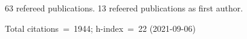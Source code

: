 63 refereed publications. 13 refeered publications as first author.

Total citations~=~1944; h-index~=~22 (2021-09-06)